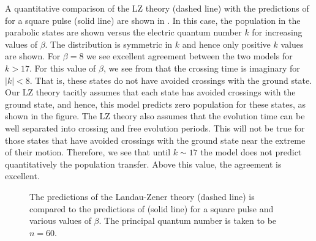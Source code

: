 A quantitative comparison of the LZ theory (dashed line) with the predictions
of  for a square pulse (solid line) are shown in .
In this case, the population in the parabolic states are shown versus
the electric quantum number $k$ for increasing values of $\beta$. 
The distribution is symmetric in $k$ and hence only positive $k$ values are
shown.  For $\beta=8$ we see excellent agreement between the two models for $k
>17$.  For this value of $\beta$, we see from  that the crossing time
is imaginary for $\left| k \right| < 8$.  That is, these states do not have
avoided crossings with the ground state.  Our LZ theory tacitly assumes that each
state has avoided crossings with the ground state, and hence, this model
predicts zero population for these states, as shown in the figure. The LZ
theory also assumes that the evolution time can be well separated into
crossing and free evolution periods.  This will not be true for those states
that have avoided crossings with the ground state near the extreme of their
motion.  Therefore, we see that  until $k \sim 17$ the model does not predict
quantitatively the population transfer.  Above this value, the agreement is
excellent.

\begin{figure}[tbp]
\bigskip
{} {The
predictions of the Landau-Zener theory (dashed line) is compared to the
predictions of  (solid line) for a square pulse and various
values of $\beta$. The principal quantum number is taken to be $n=60$.
\label{poplz}}
\end{figure}


